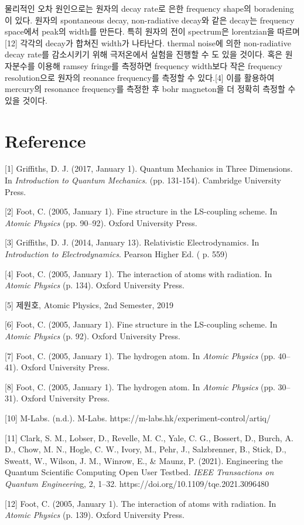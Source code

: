 \documentclass[%
 reprint,
 amsmath,amssymb,
 aps,
]{revtex4-2}
\begin{document}
물리적인 오차 원인으로는 원자의 decay rate로 은한 frequency shape의 boradening이 있다. 원자의 spontaneous decay,  non-radiative decay와 같은 decay는 frequency space에서 peak의 width를 만든다. 특히 원자의 전이 spectrum은 lorentzian을 따르며[12] 각각의 decay가 합쳐진 width가 나타난다. thermal noise에 의한 non-radiative decay rate를 감소시키기 위해 극저온에서 실험을 진행할 수 도 있을 것이다. 혹은 원자분수를 이용해 ramsey fringe를 측정하면 frequency width보다 작은 frequency resolution으로 원자의 reonance frequency를 측정할 수 있다.[4] 이를 활용하여 mercury의 resonance frequency를 측정한 후 bohr magneton을 더 정확히 측정할 수 있을 것이다.

\section{\label{sec:level1}Reference}
[1] Griffiths, D. J. (2017, January 1). Quantum Mechanics in Three Dimensions. In \textit{Introduction to Quantum Mechanics}. (pp. 131-154). Cambridge University Press.

[2] Foot, C. (2005, January 1). Fine structure in the LS-coupling scheme. In \textit{Atomic Physics} (pp. 90–92). Oxford University Press.

[3] Griffiths, D. J. (2014, January 13). Relativistic Electrodynamics. In \textit{Introduction to Electrodynamics}. Pearson Higher Ed. ( p. 559)

[4] Foot, C. (2005, January 1). The interaction of atoms with radiation. In \textit{Atomic Physics} (p. 134). Oxford University Press.

[5] 제원호, Atomic Physics, 2nd Semester, 2019

[6] Foot, C. (2005, January 1). Fine structure in the LS-coupling scheme. In \textit{Atomic Physics} (p. 92). Oxford University Press.

[7] Foot, C. (2005, January 1). The hydrogen atom. In \textit{Atomic Physics} (pp. 40–41). Oxford University Press.

[8]  Foot, C. (2005, January 1). The hydrogen atom. In \textit{Atomic Physics} (pp. 30–31). Oxford University Press.

[10] M-Labs. (n.d.). M-Labs. https://m-labs.hk/experiment-control/artiq/

[11] Clark, S. M., Lobser, D., Revelle, M. C., Yale, C. G., Bossert, D., Burch, A. D., Chow, M. N., Hogle, C. W., Ivory, M., Pehr, J., Salzbrenner, B., Stick, D., Sweatt, W., Wilson, J. M., Winrow, E., \& Maunz, P. (2021). Engineering the Quantum Scientific Computing Open User Testbed. \textit{IEEE Transactions on Quantum Engineerin}g, 2, 1–32. https://doi.org/10.1109/tqe.2021.3096480

[12]  Foot, C. (2005, January 1). The interaction of atoms with radiation. In \textit{Atomic Physics} (p. 139). Oxford University Press.
\end{document}
